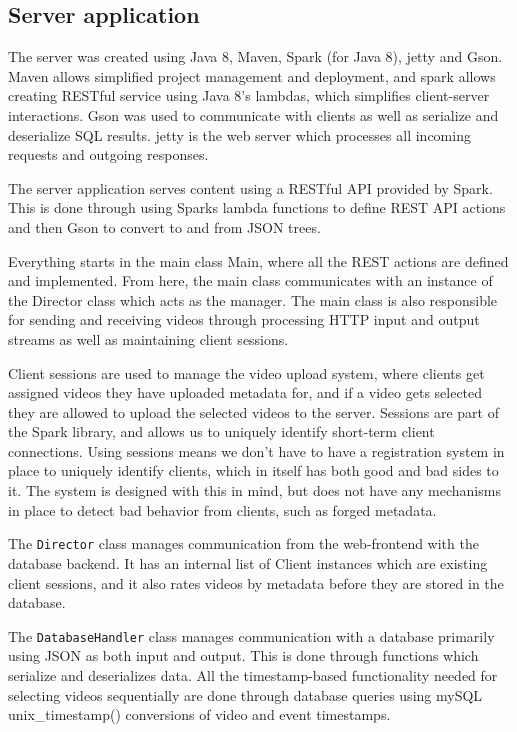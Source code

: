 \documentclass[conference]{IEEEtran}
\begin{document}
\subsection{Server application}

The server was created using Java 8, Maven, Spark (for Java 8), jetty and Gson. Maven allows simplified project
management and deployment, and spark allows creating RESTful service using Java 8's lambdas, which
simplifies client-server interactions. Gson was used to communicate with clients as well as serialize
and deserialize SQL results. jetty is the web server which processes all incoming requests and outgoing responses.

The server application serves content using a RESTful API provided by Spark. This is done through using Sparks
lambda functions to define REST API actions and then Gson to convert to and from JSON trees.

Everything starts in the main class Main, where all the REST actions are defined and implemented. From here,
the main class communicates with an instance of the Director class which acts as the manager. The main
class is also responsible for sending and receiving videos through processing HTTP input and output streams
as well as maintaining client sessions.

Client sessions are used to manage the video upload system, where clients get assigned videos they have uploaded
metadata for, and if a video gets selected they are allowed to upload the selected videos to the server.
Sessions are part of the Spark library, and allows us to uniquely identify short-term client connections. Using
sessions means we don't have to have a registration system in place to uniquely identify clients, which in itself
has both good and bad sides to it. The system is designed with this in mind, but does not have any mechanisms in
place to detect bad behavior from clients, such as forged metadata.

The \texttt{Director} class manages communication from the web-frontend with the database backend. It has an internal list
of Client instances which are existing client sessions, and it also rates videos by metadata before they are
stored in the database.

The \texttt{DatabaseHandler} class manages communication with a database primarily using JSON as both input and output.
This is done through functions which serialize and deserializes data. All the timestamp-based functionality needed
for selecting videos sequentially are done through database queries using mySQL unix\_timestamp() conversions of
video and event timestamps.
\end{document}
